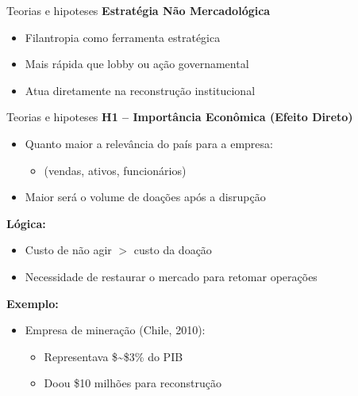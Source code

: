 \documentclass[
  10pt,
  ignorenonframetext,
  aspectratio=169,
  brazilian,
]{beamer}
\providecommand{\tightlist}{%
  \setlength{\itemsep}{0pt}\setlength{\parskip}{0pt}}
\begin{document}
\begin{frame}{Teorias e hipoteses}
\label{teorias-e-hipoteses-6}
\textbf{Estratégia Não Mercadológica}

\begin{itemize}
\tightlist
\item
  Filantropia como ferramenta estratégica
\item
  Mais rápida que lobby ou ação governamental
\item
  Atua diretamente na reconstrução institucional
\end{itemize}
\end{frame}

\begin{frame}{Teorias e hipoteses}
\label{teorias-e-hipoteses-7}
\textbf{H1 – Importância Econômica (Efeito Direto)}

\begin{itemize}
\tightlist
\item
  Quanto maior a relevância do país para a empresa:

  \begin{itemize}
  \tightlist
  \item
    (vendas, ativos, funcionários)
  \end{itemize}
\item
  Maior será o volume de doações após a disrupção
\end{itemize}

\textbf{Lógica:}

\begin{itemize}
\tightlist
\item
  Custo de não agir \(>\) custo da doação
\item
  Necessidade de restaurar o mercado para retomar operações
\end{itemize}

\textbf{Exemplo:}

\begin{itemize}
\tightlist
\item
  Empresa de mineração (Chile, 2010):

  \begin{itemize}
  \tightlist
  \item
    Representava \$\sim\$3\% do PIB
  \item
    Doou \$10 milhões para reconstrução
  \end{itemize}
\end{itemize}
\end{frame}
\end{document}
